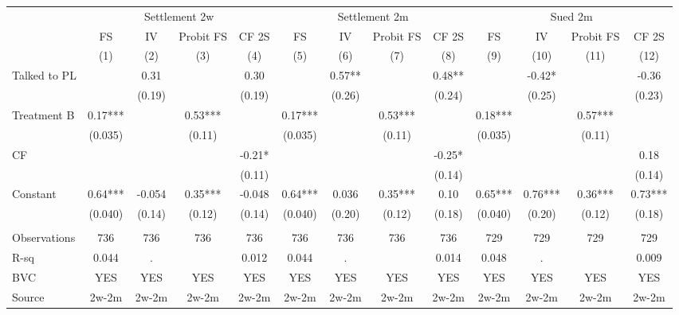 \begin{tabular}{lcccccccccccc}
\cmidrule{2-13}\multicolumn{1}{r|}{} & \multicolumn{4}{c|}{Settlement 2w} & \multicolumn{4}{c|}{Settlement 2m} & \multicolumn{4}{c|}{Sued 2m} \\
      & FS    & IV    & Probit FS & CF 2S & FS    & IV    & Probit FS & CF 2S & FS    & IV    & Probit FS & CF 2S \\
\midrule
\midrule
      & (1)   & (2)   & (3)   & (4)   & (5)   & (6)   & (7)   & (8)   & (9)   & (10)  & (11)  & (12) \\
\midrule
\midrule
Talked to PL &       & 0.31  &       & 0.30  &       & 0.57** &       & 0.48** &       & -0.42* &       & -0.36 \\
      &       & (0.19) &       & (0.19) &       & (0.26) &       & (0.24) &       & (0.25) &       & (0.23) \\
Treatment B & 0.17*** &       & 0.53*** &       & 0.17*** &       & 0.53*** &       & 0.18*** &       & 0.57*** &  \\
      & (0.035) &       & (0.11) &       & (0.035) &       & (0.11) &       & (0.035) &       & (0.11) &  \\
CF    &       &       &       & -0.21* &       &       &       & -0.25* &       &       &       & 0.18 \\
      &       &       &       & (0.11) &       &       &       & (0.14) &       &       &       & (0.14) \\
Constant  & 0.64*** & -0.054 & 0.35*** & -0.048 & 0.64*** & 0.036 & 0.35*** & 0.10  & 0.65*** & 0.76*** & 0.36*** & 0.73*** \\
      & (0.040) & (0.14) & (0.12) & (0.14) & (0.040) & (0.20) & (0.12) & (0.18) & (0.040) & (0.20) & (0.12) & (0.18) \\
      &       &       &       &       &       &       &       &       &       &       &       &  \\
\midrule
Observations & 736   & 736   & 736   & 736   & 736   & 736   & 736   & 736   & 729   & 729   & 729   & 729 \\
R-sq  & 0.044 & .     &       & 0.012 & 0.044 & .     &       & 0.014 & 0.048 & .     &       & 0.009 \\
BVC   & YES   & YES   & YES   & YES   & YES   & YES   & YES   & YES   & YES   & YES   & YES   & YES \\
Source & 2w-2m & 2w-2m & 2w-2m & 2w-2m & 2w-2m & 2w-2m & 2w-2m & 2w-2m & 2w-2m & 2w-2m & 2w-2m & 2w-2m \\
\bottomrule
\bottomrule
\end{tabular}%
